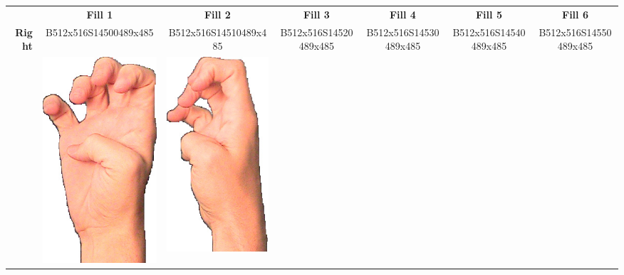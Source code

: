 \documentclass{article}
\begin{document}
\begin{center}
\begin{tabular}{r*{6}{c}}
&\textbf{Fill 1}&\textbf{Fill 2}&\textbf{Fill 3}&\textbf{Fill 4}&\textbf{Fill 5}&\textbf{Fill 6}\\
\multirow{2}{*}{\textbf{Right}}&
B512x516S14500489x485&
B512x516S14510489x485&
B512x516S14520489x485&
B512x516S14530489x485&
B512x516S14540489x485&
B512x516S14550489x485\\
&
\includegraphics[scale=0.1]{images/04-02-1.jpg}&
\includegraphics[scale=0.1]{images/04-02-2.jpg}&

\end{tabular}
\end{center}
\end{document}
